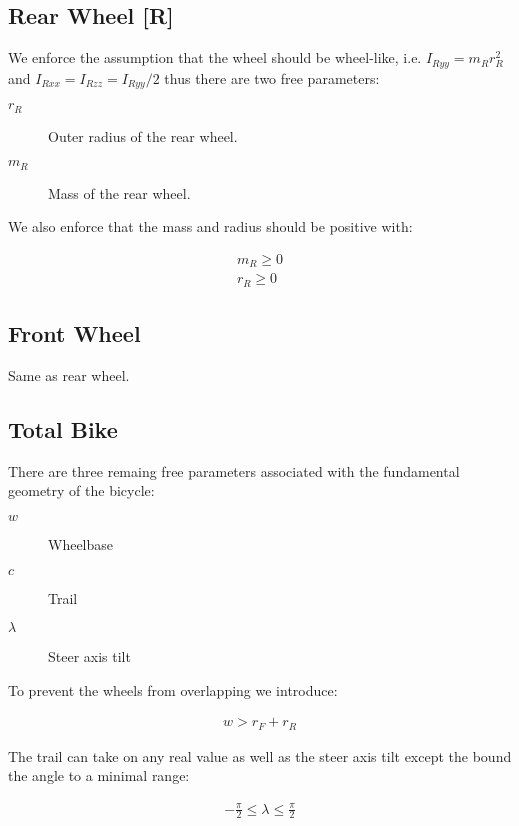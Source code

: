 \documentclass{article}
\begin{document}
\subsection{Rear Wheel [R]}

We enforce the assumption that the wheel should be wheel-like, i.e. $I_{Ryy} =
m_R r_R^2$ and $I_{Rxx} = I_{Rzz} = I_{Ryy} / 2$ thus there are two free
parameters:

\begin{description}
  \item[$r_R$] Outer radius of the rear wheel.
  \item[$m_R$] Mass of the rear wheel.
\end{description}

We also enforce that the mass and radius should be positive with:

\begin{align}
  m_R \geq 0 \\
  r_R \geq 0
\end{align}

\subsection{Front Wheel}

Same as rear wheel.

\subsection{Total Bike}

There are three remaing free parameters associated with the fundamental
geometry of the bicycle:

\begin{description}
  \item[$w$] Wheelbase
  \item[$c$] Trail
  \item[$\lambda$] Steer axis tilt
\end{description}

To prevent the wheels from overlapping we introduce:

\begin{align}
  w > r_F + r_R
\end{align}

The trail can take on any real value as well as the steer axis tilt except the
bound the angle to a minimal range:

\begin{align}
  -\frac{\pi}{2} \leq \lambda \leq \frac{\pi}{2}
\end{align}
\end{document}
